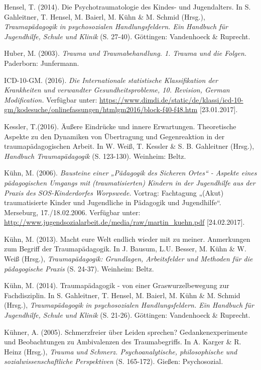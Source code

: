 \hang
Hensel, T. (2014). Die Psychotraumatologie des Kindes- und Jugendalters. In S. Gahleitner, T. Hensel, M. Baierl, M. K{\"u}hn \& M. Schmid (Hrsg.), \textit{Traumap{\"a}dagogik in psychosozialen Handlungsfeldern. Ein Handbuch f{\"u}r Jugendhilfe, Schule und Klinik} (S. 27-40). Göttingen: Vandenhoeck \& Ruprecht.

\hang
Huber, M. (2003). \textit{Trauma und Traumabehandlung. 1. Trauma und die Folgen.} Paderborn: Junfermann.

\hang
ICD-10-GM. (2016). \textit{Die Internationale statistische Klassifikation der Krankheiten und verwandter Gesundheitsprobleme, 10. Revision, German Modification.} Verfügbar unter: \url{https://www.dimdi.de/static/de/klassi/icd-10-gm/kodesuche/onlinefassungen/htmlgm2016/block-f40-f48.htm} [23.01.2017].

\hang
Kessler, T.(2016). {\"A}ußere Eindr{\"u}cke und innere Erwartungen. Theoretische Aspekte zu den Dynamiken von {\"U}bertragung und Gegenreaktion in der traumap{\"a}dagogischen Arbeit. In W. Weiß, T. Kessler \& S. B. Gahleitner (Hrsg.), \textit{Handbuch Traumapädagogik} (S. 123-130). Weinheim: Beltz.

\hang
Kühn, M. (2006). \textit{Bausteine einer „P{\"a}dagogik des Sicheren Ortes“ - Aspekte eines p{\"a}dagogischen Umgangs mit (traumatisierten) Kindern in der Jugendhilfe aus der Praxis des SOS-Kinderdorfes Worpswede.} Vortrag: Fachtagung „(Akut) traumatisierte Kinder und Jugendliche in P{\"a}dagogik und Jugendhilfe“. Merseburg, 17./18.02.2006. Verfügbar unter: \url{http://www.jugendsozialarbeit.de/media/raw/martin_kuehn.pdf} [24.02.2017].

\hang
Kühn, M. (2013). Macht eure Welt endlich wieder mit zu meiner. Anmerkungen zum Begriff der Traumapädagogik. In J. Bausum, L.U. Besser, M. Kühn \& W. Weiß (Hrsg.), \textit{Traumapädagogik: Grundlagen, Arbeitsfelder und Methoden für die pädagogische Praxis} (S. 24-37). Weinheim: Beltz.

\hang
Kühn, M. (2014). Traumap{\"a}dagogik - von einer Graswurzelbewegung zur Fachdisziplin. In S. Gahleitner, T. Hensel, M. Baierl, M. K{\"u}hn \& M. Schmid (Hrsg.), \textit{Traumap{\"a}dagogik in psychosozialen Handlungsfeldern. Ein Handbuch f{\"u}r Jugendhilfe, Schule und Klinik} (S. 21-26). Göttingen: Vandenhoeck \& Ruprecht.

\hang
K{\"u}hner, A. (2005). Schmerzfreier {\"u}ber Leiden sprechen? Gedankenexperimente und Beobachtungen zu Ambivalenzen des Traumabegriffs. In A. Karger \& R. Heinz (Hrsg.), \textit{Trauma und Schmerz. Psychoanalytische, philosophische und sozialwissenschaftliche Perspektiven} (S. 165-172). Gießen: Psychosozial.

